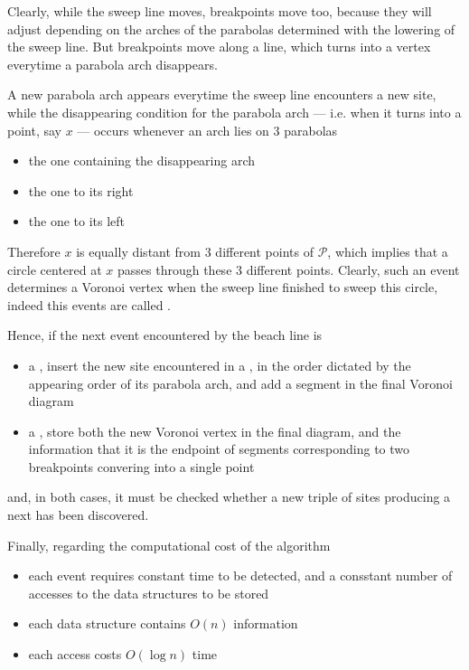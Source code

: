 \documentclass[a4paper, 12pt]{report}
\begin{document}

    Clearly, while the sweep line moves, breakpoints move too, because they will adjust depending on the arches of the parabolas determined with the lowering of the sweep line. But breakpoints move along a line, which turns into a vertex everytime a parabola arch disappears.


    A new parabola arch appears everytime the sweep line encounters a new site, while the disappearing condition for the parabola arch --- i.e. when it turns into a point, say $x$ --- occurs whenever an arch lies on 3 parabolas

    \begin{itemize}
        \item the one containing the disappearing arch
        \item the one to its right
        \item the one to its left
    \end{itemize}

    Therefore $x$ is equally distant from 3 different points of $\mathcal P$, which implies that a circle centered at $x$ passes through these 3 different points. Clearly, such an event determines a Voronoi vertex when the sweep line finished to sweep this circle, indeed this events are called .

    Hence, if the next event encountered by the beach line is

    \begin{itemize}
        \item a , insert the new site encountered in a , in the order dictated by the appearing order of its parabola arch, and add a segment in the final Voronoi diagram
        \item a , store both the new Voronoi vertex in the final diagram, and the information that it is the endpoint of segments corresponding to two breakpoints convering into a single point
    \end{itemize}

    and, in both cases, it must be checked whether a new triple of sites producing a next  has been discovered.
    
    Finally, regarding the computational cost of the algorithm

    \begin{itemize}
        \item each event requires constant time to be detected, and a consstant number of accesses to the data structures to be stored
        \item each data structure contains $O(n)$ information
        \item each access costs $O(\log n)$ time
    \end{itemize}
\end{document}
